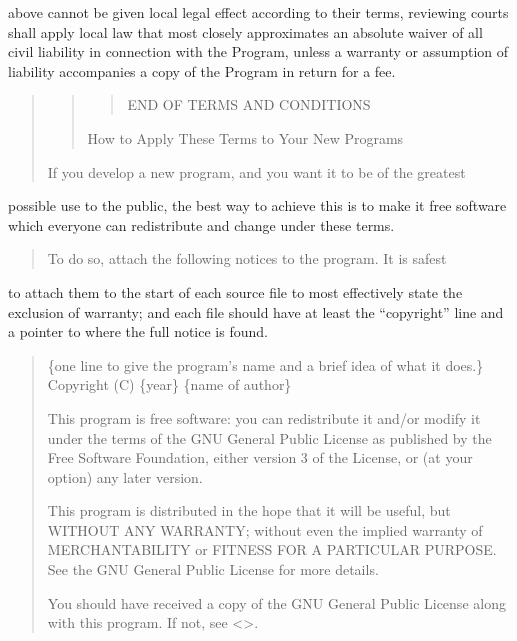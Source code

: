 \documentclass[letterpaper,10pt,english]{sphinxmanual}
\begin{document}
above cannot be given local legal effect according to their terms,
reviewing courts shall apply local law that most closely approximates
an absolute waiver of all civil liability in connection with the
Program, unless a warranty or assumption of liability accompanies a
copy of the Program in return for a fee.
\begin{quote}
\begin{quote}
\begin{quote}

END OF TERMS AND CONDITIONS
\end{quote}

How to Apply These Terms to Your New Programs
\end{quote}

If you develop a new program, and you want it to be of the greatest
\end{quote}

possible use to the public, the best way to achieve this is to make it
free software which everyone can redistribute and change under these terms.
\begin{quote}

To do so, attach the following notices to the program.  It is safest
\end{quote}

to attach them to the start of each source file to most effectively
state the exclusion of warranty; and each file should have at least
the “copyright” line and a pointer to where the full notice is found.
\begin{quote}

\{one line to give the program’s name and a brief idea of what it does.\}
Copyright (C) \{year\}  \{name of author\}

This program is free software: you can redistribute it and/or modify
it under the terms of the GNU General Public License as published by
the Free Software Foundation, either version 3 of the License, or
(at your option) any later version.

This program is distributed in the hope that it will be useful,
but WITHOUT ANY WARRANTY; without even the implied warranty of
MERCHANTABILITY or FITNESS FOR A PARTICULAR PURPOSE.  See the
GNU General Public License for more details.

You should have received a copy of the GNU General Public License
along with this program.  If not, see \textless{}\textgreater{}.
\end{quote}
\end{document}
